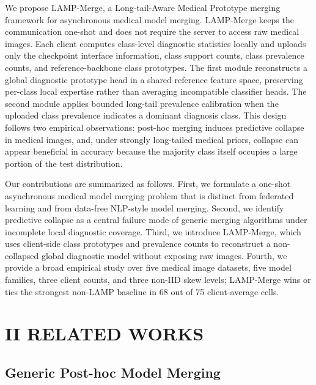 We propose LAMP-Merge, a Long-tail-Aware Medical Prototype merging framework for asynchronous medical model merging. LAMP-Merge keeps the communication one-shot and does not require the server to access raw medical images. Each client computes class-level diagnostic statistics locally and uploads only the checkpoint interface information, class support counts, class prevalence counts, and reference-backbone class prototypes. The first module reconstructs a global diagnostic prototype head in a shared reference feature space, preserving per-class local expertise rather than averaging incompatible classifier heads. The second module applies bounded long-tail prevalence calibration when the uploaded class prevalence indicates a dominant diagnosis class. This design follows two empirical observations: post-hoc merging induces predictive collapse in medical images, and, under strongly long-tailed medical priors, collapse can appear beneficial in accuracy because the majority class itself occupies a large portion of the test distribution.

Our contributions are summarized as follows. First, we formulate a one-shot asynchronous medical model merging problem that is distinct from federated learning and from data-free NLP-style model merging. Second, we identify predictive collapse as a central failure mode of generic merging algorithms under incomplete local diagnostic coverage. Third, we introduce LAMP-Merge, which uses client-side class prototypes and prevalence counts to reconstruct a non-collapsed global diagnostic model without exposing raw images. Fourth, we provide a broad empirical study over five medical image datasets, five model families, three client counts, and three non-IID skew levels; LAMP-Merge wins or ties the strongest non-LAMP baseline in 68 out of 75 client-average cells.

\section{II RELATED WORKS}

\subsection{Generic Post-hoc Model Merging}

